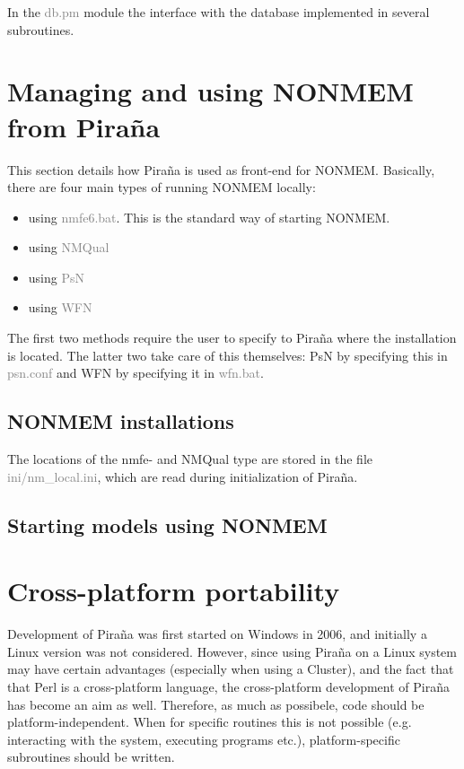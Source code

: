 \documentclass[a4,11pt]{report}
\begin{document}
\noindent In the \textcolor{Grey}{db.pm} module the interface with the
database implemented in several subroutines.

\section{Managing and using NONMEM from Pira\~na} This section details
how Pira\~na is used as front-end for NONMEM. Basically, there are
four main types of running NONMEM locally:
\begin{itemize}
  \item using \textcolor{Grey}{nmfe6.bat}. This is the standard way of
starting NONMEM.
  \item using \textcolor{Grey}{NMQual}
  \item using \textcolor{Grey}{PsN}
  \item using \textcolor{Grey}{WFN}
\end{itemize} The first two methods require the user to specify to
Pira\~na where the installation is located. The latter two take care
of this themselves: PsN by specifying this in
\textcolor{Grey}{psn.conf} and WFN by specifying it in
\textcolor{Grey}{wfn.bat}.

\subsection{NONMEM installations} The locations of the nmfe- and
NMQual type are stored in the file
\textcolor{Grey}{ini/nm\_local.ini}, which are read during
initialization of Pira\~na.

\subsection{Starting models using NONMEM}


\pagebreak
\section{Cross-platform portability} Development of Pira\~na was first
started on Windows in 2006, and initially a Linux version was not
considered. However, since using Pira\~na on a Linux system may have
certain advantages (especially when using a Cluster), and the fact
that that Perl is a cross-platform language, the cross-platform
development of Pira\~na has become an aim as well. Therefore, as much
as possibele, code should be platform-independent. When for specific
routines this is not possible (e.g. interacting with the system,
executing programs etc.), platform-specific subroutines should be
written.
\end{document}
